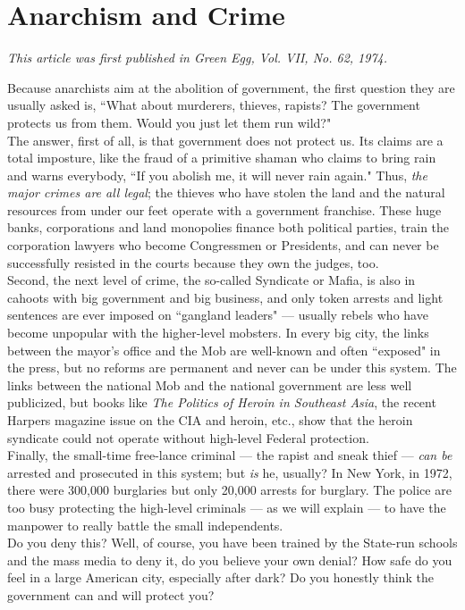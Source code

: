 \chapter{Anarchism and Crime}

\emph{This article was first published in Green Egg, Vol. VII, No. 62, 1974.\\}

Because anarchists aim at the abolition of government, the first question they are usually asked is, ``What about murderers, thieves, rapists? The government protects us from them. Would you just let them run wild?"\\
The answer, first of all, is that government does not protect us. Its claims are a total imposture, like the fraud of a primitive shaman who claims to bring rain and warns everybody, ``If you abolish me, it will never rain again." Thus, \emph{the major crimes are all legal}; the thieves who have stolen the land and the natural resources from under our feet operate with a government franchise. These huge banks, corporations and land monopolies finance both political parties, train the corporation lawyers who become Congressmen or Presidents, and can never be successfully resisted in the courts because they own the judges, too.\\
Second, the next level of crime, the so-called Syndicate or Mafia, is also in cahoots with big government and big business, and only token arrests and light sentences are ever imposed on ``gangland leaders" --- usually rebels who have become unpopular with the higher-level mobsters. In every big city, the links between the mayor’s office and the Mob are well-known and often ``exposed" in the press, but no reforms are permanent and never can be under this system. The links between the national Mob and the national government are less well publicized, but books like \emph{The Politics of Heroin in Southeast Asia}, the recent Harpers magazine issue on the CIA and heroin, etc., show that the heroin syndicate could not operate without high-level Federal protection.\\
Finally, the small-time free-lance criminal --- the rapist and sneak thief --- \emph{can be} arrested and prosecuted in this system; but \emph{is} he, usually? In New York, in 1972, there were 300,000 burglaries but only 20,000 arrests for burglary. The police are too busy protecting the high-level criminals --- as we will explain --- to have the manpower to really battle the small independents.\\
Do you deny this? Well, of course, you have been trained by the State-run schools and the mass media to deny it, do you believe your own denial? How safe do you feel in a large American city, especially after dark? Do you honestly think the government can and will protect you?


